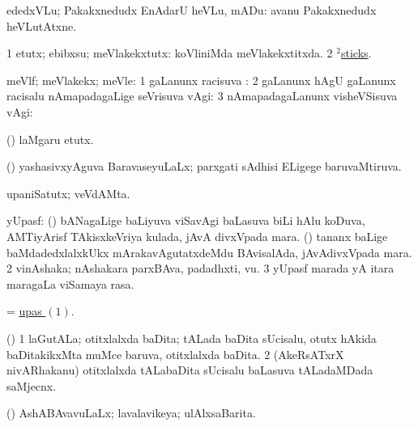 \noindent
\gl{\akirx}
\expl{}
\bmng
ededxVLu; Pakakxnedudx EnAdarU heVLu, mADu:  avanu Pakakxnedudx heVLutAtxne. 
\emng

\noindent
\gl{\pagu}
\expl{}
\bmng
\bnum
\num{1}  etutx; ebibxsu; meVlakekxtutx:  koVliniMda meVlakekxtitxda. 
\num{2}  \hyperref{kandict_s.pdf}{S}{stick(2) pagu(6)}{$^2$sticks}. 
\enum
\emng
\eentry

\bentry
{} 
\gl{\pUparx}
\expl{}
\bmng
meVlf; meVlakekx; meVle: 
\bnum
\num{1} \kirxvi gaLanunx racisuva \pUparx:  
\num{2} \kirxvi gaLanunx hAgU \gu gaLanunx racisalu nAmapadagaLige seVrisuva \upa vAgi:  
\num{3} nAmapadagaLanunx visheVSisuva \gu vAgi:  
\enum
\emng
\eentry

\bentry
{} 
\gl{\sakirx}
\expl{}
\bmng
(\nw) laMgaru etutx. 
\emng
\eentry

\bentry
{} 
\gl{\gu}
\expl{}
\bmng
(\AmA) yashasivxyAguva BaravaseyuLaLx; parxgati sAdhisi ELigege baruvaMtiruva. 
\emng
\eentry

\bentry
{} 
\gl{\nA}
\expl{}
\bmng
upaniSatutx; veVdAMta. 
\emng
\eentry

\bentry
{} 
\gl{\nA}
\bmng
\hypertarget{upas(1)}{} 
\bnum
{} yUpasf: 
\banum
{} (\savi) bANagaLige baLiyuva viSavAgi baLasuva biLi hAlu koDuva, AMTiyArisf TAkisxkeVriya kulada, jAvA divxVpada mara. 
 (\pu) tananx baLige baMdadedxlalxkUkx mArakavAgutatxdeMdu BAvisalAda, jAvAdivxVpada mara. 
\eanum
\numie
\num{2} vinAshaka; nAshakara parxBAva, padadhxti, \mo vu. 
\num{3} yUpasf marada yA itara maragaLa viSamaya rasa. 
\enum
\emng
\eentry

\bentry
{} 
\gl{\nA}
\expl{}
\bmng
= \hyperlink{upas(1)}{upas \((1)\)}. 
\emng
\eentry

\bentry
{} 
\gl{\nA}
\expl{}
\bmng
(\saM) 
\bnum
\num{1} laGutALa; otitxlalxda baDita; tALada baDita sUcisalu, otutx hAkida baDitakikxMta muMce baruva, otitxlalxda baDita. 
\num{2} (AkeRsATxrX nivARhakanu) otitxlalxda tALabaDita sUcisalu baLasuva tALadaMDada saMjecnx. 
\enum
\emng
\eentry

\bentry
{} 
\gl{\gu}
\expl{}
\bmng
(\AmA) AshABAvavuLaLx; lavalavikeya; ulAlxsaBarita. 
\emng
\eentry


